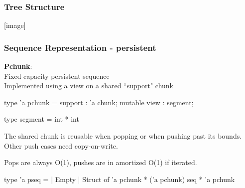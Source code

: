\begin{frame}[fragile]
\frametitle{Tree Structure}
[image]

\end{frame}



\begin{frame}[fragile]
\frametitle{Sequence Representation - persistent}

\textbf{Pchunk}:\\
Fixed capacity persistent sequence\\
Implemented using a view on a shared ``support" chunk

\begin{caml}
  type 'a pchunk = {
    support : 'a chunk;
    mutable view : segment; }
\end{caml}

\begin{caml}
type segment = int * int
\end{caml}

\medskip

The shared chunk is reusable when popping or when pushing past its bounds. Other push cases need copy-on-write.

\medskip

Pops are always O(1), pushes are in amortized O(1) if iterated.

\begin{caml}
 type 'a pseq =
 | Empty
 | Struct of 'a pchunk * ('a pchunk) seq * 'a pchunk
\end{caml}

\end{frame}

